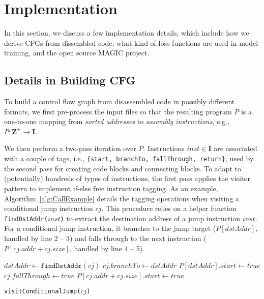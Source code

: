 \section{Implementation}
\label{MG:Sec:Implement}

In this section, we discuss a few implementation details, which include how we derive CFGs from dissembled code, what kind of loss functions are used in model training, and the open source MAGIC project.

\subsection{Details in Building CFG}
\label{sec:BuildCfg}
To build a control flow graph from disassembled code in possibly different formats, we first pre-process the input files so that the resulting program $P$ is a one-to-one mapping from \textit{sorted addresses} to \textit{assembly instructions}, e.g., $P: \mathbf{Z}^+ \rightarrow \mathbf{I}$.

We then perform a two-pass iteration over $P$.
Instructions $inst \in \mathbf{I}$ are associated with a couple of tags,
i.e., \texttt{\{start, branchTo, fallThrough, return\}}, used by the second pass for creating code blocks and connecting blocks.
To adapt to (potentially) hundreds of types of instructions, the first pass applies the visitor pattern to implement if-else free instruction tagging.
As an example, Algorithm~\ref{alg:CallExample} details the tagging operations when visiting a conditional jump instruction $cj$.
This procedure relies on a helper function \texttt{findDstAddr($inst$)} to extract the destination address of a jump instruction $inst$.
For a conditional jump instruction,
it branches to the jump target ($P[dstAddr]$, handled by line 2 -- 3) and falls through to the next instruction ($P[cj.addr + cj.size]$, handled by line 4 -- 5).


\begin{algorithm}[t]
    \DontPrintSemicolon
    $dstAddr \gets \texttt{findDstAddr}(cj)$\;
    $cj.branchTo \gets dstAddr$\;
    $P[dstAddr].start \gets true$\;
    $cj.fallThrough \gets true$\;
    $P[cj.addr + cj.size].start \gets true$\;
    \caption{\texttt{visitConditionalJump($cj$)}}
    \label{alg:CallExample}
\end{algorithm}

